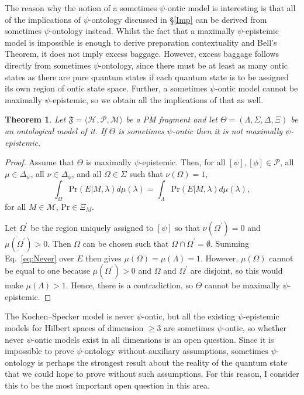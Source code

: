 \documentclass[DIV=calc,paper=a4,fontsize=11pt,twocolumn]{scrartcl} %
\theoremstyle{definition}
\theoremstyle{plain}
\newtheorem{theorem}[definition]{Theorem}
\newcommand{\Proj}[1]{\ensuremath{\left [ #1 \right ]}}
\newcommand{\Hilb}[1][]{\ensuremath{\mathcal{H}_{#1}}}
\begin{document}
The reason why the notion of a sometimes $\psi$-ontic model is
interesting is that all of the implications of $\psi$-ontology
discussed in \S\ref{Imp} can be derived from sometimes $\psi$-ontology
instead.  Whilst the fact that a maximally $\psi$-epistemic model is
impossible is enough to derive preparation contextuality and Bell's
Theorem, it does not imply excess baggage.  However, excess baggage
follows directly from sometimes $\psi$-ontology, since there must be
at least as many ontic states as there are pure quantum states if each
quantum state is to be assigned its own region of ontic state space.
Further, a sometimes $\psi$-ontic model cannot be maximally
$\psi$-epistemic, so we obtain all the implications of that as well.

\begin{theorem}
Let $\mathfrak{F} = \langle \Hilb, \mathcal{P}, \mathcal{M} \rangle$
be a PM fragment and let $\Theta = (\Lambda, \Sigma, \Delta, \Xi)$ be
an ontological model of it.  If $\Theta$ is sometimes $\psi$-ontic then
it is not maximally $\psi$-epistemic.
\end{theorem}
\begin{proof}
Assume that $\Theta$ is maximally $\psi$-epistemic.  Then, for all
$\Proj{\psi}, \Proj{\phi} \in \mathcal{P}$, all $\mu \in
\Delta_{\psi}$, all $\nu \in \Delta_{\phi}$, and all $\Omega \in
\Sigma$ such that $\nu(\Omega) = 1$,
\begin{equation}
\label{eq:Never}
\int_{\Omega} \text{Pr}(E|M,\lambda)d\mu(\lambda) = \int_{\Lambda}
\text{Pr}(E|M,\lambda)d\mu(\lambda),
\end{equation}
for all $M \in \mathcal{M}$, $\text{Pr} \in \Xi_M$.

Let $\Omega^{\prime}$ be the region uniquely assigned to
$\Proj{\psi}$ so that $\nu(\Omega^{\prime}) = 0$ and
$\mu(\Omega^{\prime}) > 0$.  Then $\Omega$ can be chosen such that
$\Omega \cap \Omega^{\prime} = \emptyset$.  Summing
Eq.~\eqref{eq:Never} over $E$ then gives $\mu(\Omega) = \mu(\Lambda)
= 1$.  However, $\mu(\Omega)$ cannot be equal to one because
$\mu(\Omega^{\prime}) > 0$ and $\Omega$ and $\Omega^{\prime}$ are
disjoint, so this would make $\mu(\Lambda) > 1$.  Hence, there is a
contradiction, so $\Theta$ cannot be maximally $\psi$-epistemic.
\end{proof}

The Kochen--Specker model is never $\psi$-ontic, but all the existing
$\psi$-epistemic models for Hilbert spaces of dimension $\geq 3$ are
sometimes $\psi$-ontic, so whether never $\psi$-ontic models exist in
all dimensions is an open question.  Since it is impossible to prove
$\psi$-ontology without auxiliary assumptions, sometimes
$\psi$-ontology is perhaps the strongest result about the reality of
the quantum state that we could hope to prove without such
assumptions.  For this reason, I consider this to be the most
important open question in this area.
\end{document}

